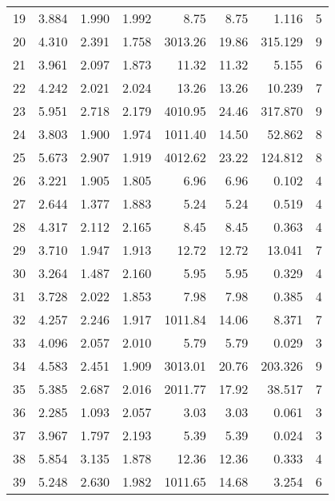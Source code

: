 \begin{tabular}{lrrrrrrr}
19 &     3.884 &      1.990 &      1.992 &     8.75 &     8.75 &    1.116 &        5 \\
20 &     4.310 &      2.391 &      1.758 &  3013.26 &    19.86 &  315.129 &        9 \\
21 &     3.961 &      2.097 &      1.873 &    11.32 &    11.32 &    5.155 &        6 \\
22 &     4.242 &      2.021 &      2.024 &    13.26 &    13.26 &   10.239 &        7 \\
23 &     5.951 &      2.718 &      2.179 &  4010.95 &    24.46 &  317.870 &        9 \\
24 &     3.803 &      1.900 &      1.974 &  1011.40 &    14.50 &   52.862 &        8 \\
25 &     5.673 &      2.907 &      1.919 &  4012.62 &    23.22 &  124.812 &        8 \\
26 &     3.221 &      1.905 &      1.805 &     6.96 &     6.96 &    0.102 &        4 \\
27 &     2.644 &      1.377 &      1.883 &     5.24 &     5.24 &    0.519 &        4 \\
28 &     4.317 &      2.112 &      2.165 &     8.45 &     8.45 &    0.363 &        4 \\
29 &     3.710 &      1.947 &      1.913 &    12.72 &    12.72 &   13.041 &        7 \\
30 &     3.264 &      1.487 &      2.160 &     5.95 &     5.95 &    0.329 &        4 \\
31 &     3.728 &      2.022 &      1.853 &     7.98 &     7.98 &    0.385 &        4 \\
32 &     4.257 &      2.246 &      1.917 &  1011.84 &    14.06 &    8.371 &        7 \\
33 &     4.096 &      2.057 &      2.010 &     5.79 &     5.79 &    0.029 &        3 \\
34 &     4.583 &      2.451 &      1.909 &  3013.01 &    20.76 &  203.326 &        9 \\
35 &     5.385 &      2.687 &      2.016 &  2011.77 &    17.92 &   38.517 &        7 \\
36 &     2.285 &      1.093 &      2.057 &     3.03 &     3.03 &    0.061 &        3 \\
37 &     3.967 &      1.797 &      2.193 &     5.39 &     5.39 &    0.024 &        3 \\
38 &     5.854 &      3.135 &      1.878 &    12.36 &    12.36 &    0.333 &        4 \\
39 &     5.248 &      2.630 &      1.982 &  1011.65 &    14.68 &    3.254 &        6 \\

\end{tabular}
